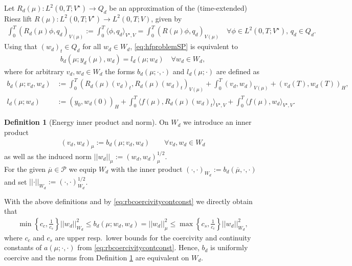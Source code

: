 \documentclass{article}
\theoremstyle{plain}
\theoremstyle{definition}
\newtheorem{definition}[theorem]{Definition}
\theoremstyle{remark}
\begin{document}
Let $R_d(\mu) : L^2(0,T; V^\star) \rightarrow Q_d$ be an approximation of the (time-extended) Riesz lift $R(\mu) : L^2(0,T; V^\star) \rightarrow L^2(0,T;V)$, given by
\begin{align}\label{eq:rieszapproximations}
    \int_0^T (R_d(\mu)\phi,q_d)_{V(\mu)}
 :=  \int_0^T \langle \phi,q_d\rangle_{V^\star,V}
  =   \int_0^T (R(\mu) \phi,q_d)_{V(\mu)}
  \quad \forall \phi \in L^2(0,T;V^\star), \, q_d \in Q_d.  
\end{align}
Using that $(w_d)_t \in Q_d$ for all $w_d \in W_d$, \eqref{eq:hfproblemSP} is equivalent to
\begin{align}
    b_d(\mu; y_d(\mu),w_d) = l_d(\mu; w_d) \quad \forall w_d \in W_d,
\end{align}
where for arbitrary $v_d, w_d \in W_d$ the forms $b_d(\mu; \cdot, \cdot)$ and $l_d(\mu; \cdot)$ are defined as
\begin{align}\label{eq:def_bd_mu}
  b_d(\mu; v_d,w_d) &:= \int_0^T (R_d(\mu)(v_d)_t, R_d(\mu)(w_d)_t)_{V(\mu)} + \int_0^T (v_d, w_d)_{V(\mu)} + (v_d(T), w_d(T))_H ,\\
    l_d(\mu; w_d)&:=(y_0,w_d(0))_H 
    + \int_0^T \langle f(\mu),R_d(\mu)(w_d)_t\rangle_{V^\star,V}
    + \int_0^T \langle f(\mu),w_d\rangle_{V^\star,V}. 
\end{align}
\begin{definition}[Energy inner product and norm]\label{defi:normequiDISCR}
On $W_d$ we introduce an inner product
\begin{align}
    (v_d, w_d)_\mu := b_d(\mu; v_d, w_d) \qquad \forall v_d, w_d \in W_d
\end{align}
as well as the induced norm $\vert \vert w_d \vert \vert_\mu := (w_d, w_d)_\mu^{1/2}$.\\For the given $\overline{\mu} \in \mathcal{P}$ we equip $W_d$ with the inner product $(\cdot, \cdot)_{W_d} := b_d(\overline{\mu}, \cdot, \cdot)$ and set $\vert \vert \cdot \vert \vert_{W_d} := (\cdot, \cdot)_{W_d}^{1/2}$.
\end{definition}
With the above definitions and by \eqref{eq:rbcoercivitycontconst} we directly obtain that
\begin{align}\label{eq:normsEnergyEqui}
    \min\left\lbrace c_c,\frac{1}{c_s}\right\rbrace \vert \vert w_d \vert \vert_{W_d}^2 \leq b_d(\mu; w_d, w_d) = \vert \vert w_d \vert \vert_\mu^2 \leq \max\left\lbrace c_s,\frac{1}{c_c} \right\rbrace \vert \vert w_d \vert \vert_{W_d}^2 ,
\end{align}
where $c_c$ and $c_s$ are upper resp.~lower bounds for the coercivity and continuity constants of $a(\mu;\cdot,\cdot)$ from \eqref{eq:rbcoercivitycontconst}. Hence, $b_d$ is uniformly coercive and the norms from Definition \ref{defi:normequiDISCR} are equivalent on $W_d$. \\
\end{document}
